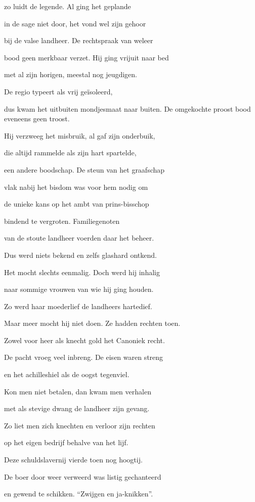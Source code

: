 zo luidt de legende.
Al ging het geplande

in de sage niet door,
het vond wel zijn gehoor

bij de valse landheer.
De rechtspraak van weleer

bood geen merkbaar verzet.
Hij ging vrijuit naar bed

met al zijn horigen,
meestal nog jeugdigen.

De regio typeert
als vrij geïsoleerd,

dus kwam het uitbuiten
mondjesmaat naar buiten.
De omgekochte proost
bood eveneens geen troost.

Hij verzweeg het misbruik,
al gaf zijn onderbuik,

die altijd rammelde
als zijn hart spartelde,

een andere boodschap.
De steun van het graafschap

vlak nabij het bisdom
was voor hem nodig om

de unieke kans op
het ambt van prins-bisschop

bindend te vergroten.
Familiegenoten

van de stoute landheer
voerden daar het beheer.

Dus werd niets bekend
en zelfs glashard ontkend.

Het mocht slechts eenmalig.
Doch werd hij inhalig

naar sommige vrouwen
van wie hij ging houden.

Zo werd haar moederlief
de landheers hartedief.

Maar meer mocht hij niet doen.
Ze hadden rechten toen.

Zowel voor heer als knecht
gold het Canoniek recht.

De pacht vroeg veel inbreng.
De eisen waren streng

en het achilleshiel
als de oogst tegenviel.

Kon men niet betalen,
dan kwam men verhalen

met als stevige dwang
de landheer zijn gevang.

Zo liet men zich knechten
en verloor zijn rechten

op het eigen bedrijf
behalve van het lijf.

Deze schuldslavernij
vierde toen nog hoogtij.

De boer door weer verweerd
was listig gechanteerd

en gewend te schikken.
“Zwijgen en ja-knikken”.

